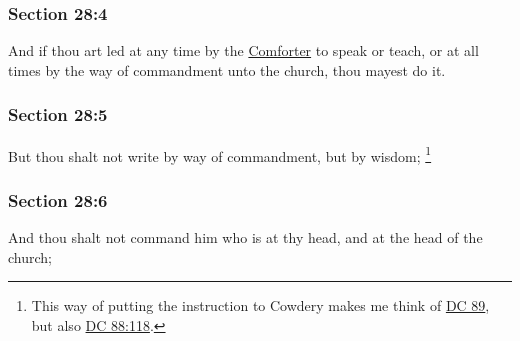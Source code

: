 	\subsubsection{Section 28:4} %
		\label{DC28-4}

		And if thou art led at any time by the \hyperref[COMFORTER]{Comforter} to speak or teach, or at all times by the way of commandment unto the church, thou mayest do it.


	\subsubsection{Section 28:5} %
		\label{DC28-5}

		But thou shalt not write by way of commandment, but by wisdom;%
			\footnote{%
				This way of putting the instruction to Cowdery makes me think of \hyperref[DC89]{DC 89}, but also \hyperref[DC88-118]{DC 88:118}.
				}


	\subsubsection{Section 28:6} %
		\label{DC28-6}

		And thou shalt not command him who is at thy head, and at the head of the church;


